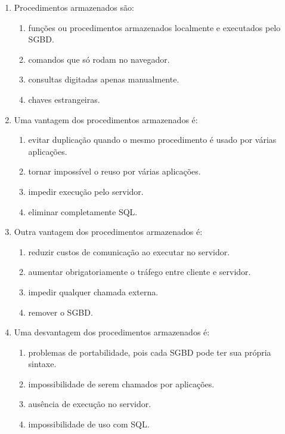 \documentclass[12pt,a4paper]{article}
\begin{document}
\begin{enumerate}[label=\textbf{Q\arabic*.}]
\item Procedimentos armazenados são:

\begin{enumerate}[label=\alph*)]
    \item funções ou procedimentos armazenados localmente e executados pelo SGBD.
    \item comandos que só rodam no navegador.
    \item consultas digitadas apenas manualmente.
    \item chaves estrangeiras.
\end{enumerate}

\item Uma vantagem dos procedimentos armazenados é:

\begin{enumerate}[label=\alph*)]
    \item evitar duplicação quando o mesmo procedimento é usado por várias aplicações.
    \item tornar impossível o reuso por várias aplicações.
    \item impedir execução pelo servidor.
    \item eliminar completamente SQL.
\end{enumerate}

\item Outra vantagem dos procedimentos armazenados é:

\begin{enumerate}[label=\alph*)]
    \item reduzir custos de comunicação ao executar no servidor.
    \item aumentar obrigatoriamente o tráfego entre cliente e servidor.
    \item impedir qualquer chamada externa.
    \item remover o SGBD.
\end{enumerate}

\item Uma desvantagem dos procedimentos armazenados é:

\begin{enumerate}[label=\alph*)]
    \item problemas de portabilidade, pois cada SGBD pode ter sua própria sintaxe.
    \item impossibilidade de serem chamados por aplicações.
    \item ausência de execução no servidor.
    \item impossibilidade de uso com SQL.
\end{enumerate}


\end{enumerate}
\end{document}
